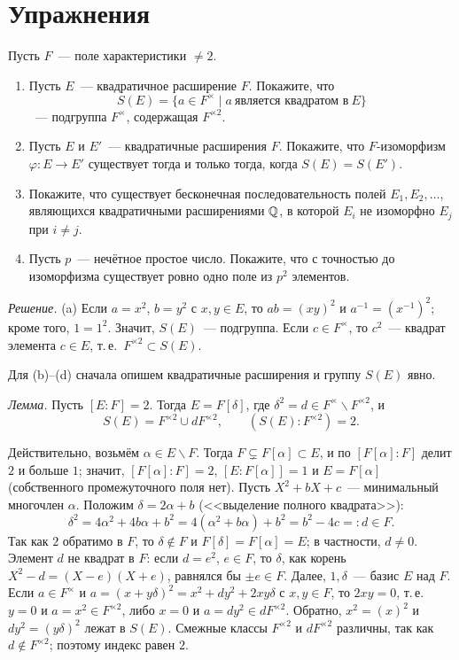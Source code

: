 \section*{Упражнения}

\begin{exercise}[2-1]
Пусть $F$~--- поле характеристики $\ne2$.
\begin{enumerate}[label=(\alph*)]
\item Пусть $E$~--- квадратичное расширение $F$. Покажите, что
\[
S(E)=\{a\in F^\times\mid a\ \text{является квадратом в}\ E\}
\]
~--- подгруппа $F^\times$, содержащая $F^{\times2}$.
\item Пусть $E$ и $E'$~--- квадратичные расширения $F$. Покажите, что $F$-изоморфизм $\varphi\colon E\to E'$ существует
тогда и только тогда, когда $S(E)=S(E')$.
\item Покажите, что существует бесконечная последовательность полей $E_1,E_2,\dots$, являющихся квадратичными
расширениями $\mathbb Q$, в которой $E_i$ не изоморфно $E_j$ при $i\ne j$.
\item Пусть $p$~--- нечётное простое число. Покажите, что с точностью до изоморфизма существует ровно одно поле из
$p^2$ элементов.
\end{enumerate}
\end{exercise}

\noindent\emph{Решение.} (a) Если $a=x^2$, $b=y^2$ с $x,y\in E$, то $ab=(xy)^2$ и $a^{-1}=(x^{-1})^2$; кроме того,
$1=1^2$. Значит, $S(E)$~--- подгруппа. Если $c\in F^\times$, то $c^2$~--- квадрат элемента $c\in E$, т.\,е.\
$F^{\times2}\subset S(E)$.

Для (b)--(d) сначала опишем квадратичные расширения и группу $S(E)$ явно.

\emph{Лемма.} Пусть $[E:F]=2$. Тогда $E=F[\delta]$, где $\delta^2=d\in F^\times\smallsetminus F^{\times2}$, и
\[
S(E)=F^{\times2}\cup dF^{\times2},\qquad (S(E):F^{\times2})=2 .
\]

Действительно, возьмём $\alpha\in E\smallsetminus F$. Тогда $F\subsetneq F[\alpha]\subset E$, и по 
$[F[\alpha]:F]$ делит $2$ и больше $1$; значит, $[F[\alpha]:F]=2$, $[E:F[\alpha]]=1$ и $E=F[\alpha]$ (собственного
промежуточного поля нет). Пусть $X^2+bX+c$~--- минимальный многочлен $\alpha$. Положим $\delta=2\alpha+b$ (<<выделение
полного квадрата>>):
\[
\delta^2=4\alpha^2+4b\alpha+b^2=4(\alpha^2+b\alpha)+b^2=b^2-4c=:d\in F .
\]
Так как $2$ обратимо в $F$, то $\delta\notin F$ и $F[\delta]=F[\alpha]=E$; в частности, $d\ne0$. Элемент $d$ не квадрат в
$F$: если $d=e^2$, $e\in F$, то $\delta$, как корень $X^2-d=(X-e)(X+e)$, равнялся бы $\pm e\in F$. Далее, $1,\delta$~---
базис $E$ над $F$. Если $a\in F^\times$ и $a=(x+y\delta)^2=x^2+dy^2+2xy\delta$ с $x,y\in F$, то $2xy=0$, т.\,е.\ $y=0$ и
$a=x^2\in F^{\times2}$, либо $x=0$ и $a=dy^2\in dF^{\times2}$. Обратно, $x^2=(x)^2$ и $dy^2=(y\delta)^2$ лежат в $S(E)$.
Смежные классы $F^{\times2}$ и $dF^{\times2}$ различны, так как $d\notin F^{\times2}$; поэтому индекс равен $2$.

